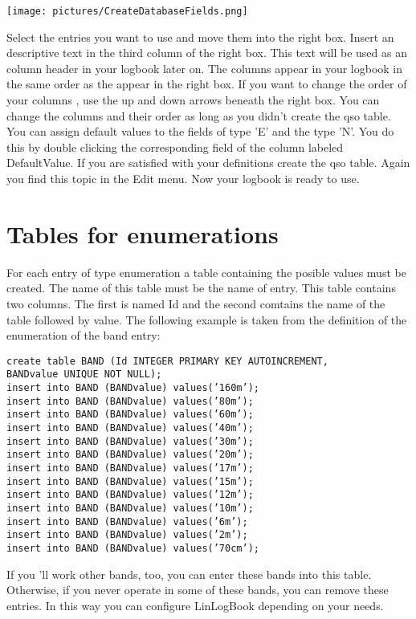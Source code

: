 \documentclass[a4paper,11pt]{article}
\begin{document}
\texttt{[image: pictures/CreateDatabaseFields.png]}\linebreak

Select the entries you want to use and move them into the right box. Insert
an descriptive text in the third column of the right box. This text will be used
as an column header in your logbook later on. The columns appear in your
logbook in the same order as the appear in the right box. If you want to change
the order of your columns , use the up and down arrows beneath the right box.
You can change the columns and their order as long as you didn’t create the
qso table.
You can assign default values to the fields of type ’E’ and the type ’N’. You do
this by double clicking the corresponding field of the column labeled DefaultValue.
If you are satisfied with your definitions create the qso table. Again you find
this topic in the Edit menu.
Now your logbook is ready to use.

\section{Tables for enumerations}\label{sec:Tables}
For each entry of type enumeration a table containing the posible values must
be created. The name of this table must be the name of entry. This table
contains two columns. The first is named Id and the second comtains the name of the
table followed by value.
The following example is taken from the definition of the enumeration of the
band entry:

\begin{verbatim}
create table BAND (Id INTEGER PRIMARY KEY AUTOINCREMENT,
BANDvalue UNIQUE NOT NULL);
insert into BAND (BANDvalue) values(’160m’);
insert into BAND (BANDvalue) values(’80m’);
insert into BAND (BANDvalue) values(’60m’);
insert into BAND (BANDvalue) values(’40m’);
insert into BAND (BANDvalue) values(’30m’);
insert into BAND (BANDvalue) values(’20m’);
insert into BAND (BANDvalue) values(’17m’);
insert into BAND (BANDvalue) values(’15m’);
insert into BAND (BANDvalue) values(’12m’);
insert into BAND (BANDvalue) values(’10m’);
insert into BAND (BANDvalue) values(’6m’);
insert into BAND (BANDvalue) values(’2m’);
insert into BAND (BANDvalue) values(’70cm’);
\end{verbatim}

If you ’ll work other bands, too, you can enter these bands into this table.
Otherwise, if you never operate in some of these bands, you can remove these
entries. In this way you can configure LinLogBook depending on your needs.
\end{document}

